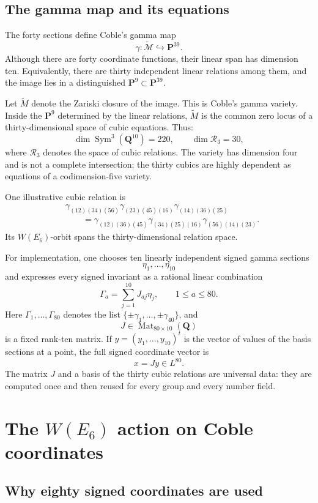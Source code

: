 \documentclass[11pt]{article}
\newcommand{\QQ}{\mathbf{Q}}
\newcommand{\PP}{\mathbf{P}}
\newcommand{\Sym}{\operatorname{Sym}}
\newcommand{\Mat}{\operatorname{Mat}}
\newcommand{\tcM}{\widetilde{\mathcal{M}}}
\newcommand{\tM}{\widetilde{M}}
\newcommand{\cR}{\mathcal{R}}
\begin{document}
\subsection{The gamma map and its equations}

The forty sections define Coble's gamma map
\[
  \gamma:\tcM\hookrightarrow\PP^{39}.
\]
Although there are forty coordinate functions, their linear span has
dimension ten.  Equivalently, there are thirty independent linear relations
among them, and the image lies in a distinguished $\PP^9\subset\PP^{39}$.

Let $\tM$ denote the Zariski closure of the image.  This is Coble's gamma
variety.  Inside the $\PP^9$ determined by the linear relations, $\tM$ is the
common zero locus of a thirty-dimensional space of cubic equations.  Thus:
\[
 \dim \Sym^3(\QQ^{10})=220,
 \qquad
 \dim \cR_3=30,
\]
where $\cR_3$ denotes the space of cubic relations.  The variety has
dimension four and is not a complete intersection; the thirty cubics are
highly dependent as equations of a codimension-five variety.

One illustrative cubic relation is
\[
\begin{aligned}
&\gamma_{(12)(34)(56)}\gamma_{(23)(45)(16)}\gamma_{(14)(36)(25)}\\
&\qquad=
\gamma_{(12)(36)(45)}\gamma_{(34)(25)(16)}\gamma_{(56)(14)(23)}.
\end{aligned}
\]
Its $W(E_6)$-orbit spans the thirty-dimensional relation space.

For implementation, one chooses ten linearly independent signed gamma
sections
\[
  \eta_1,\ldots,\eta_{10}
\]
and expresses every signed invariant as a rational linear combination
\[
  \Gamma_a=\sum_{j=1}^{10}J_{aj}\eta_j,
  \qquad 1\leq a\leq80.
\]
Here $\Gamma_1,\ldots,\Gamma_{80}$ denotes the list
$\{\pm\gamma_1,\ldots,\pm\gamma_{40}\}$, and
\[
  J\in\Mat_{80\times10}(\QQ)
\]
is a fixed rank-ten matrix.  If $y=(y_1,\ldots,y_{10})^t$ is the vector of
values of the basis sections at a point, the full signed coordinate vector is
\[
  x=Jy\in L^{80}.
\]
The matrix $J$ and a basis of the thirty cubic relations are universal data:
they are computed once and then reused for every group and every number
field.

\section{The $W(E_6)$ action on Coble coordinates}

\subsection{Why eighty signed coordinates are used}
\end{document}
